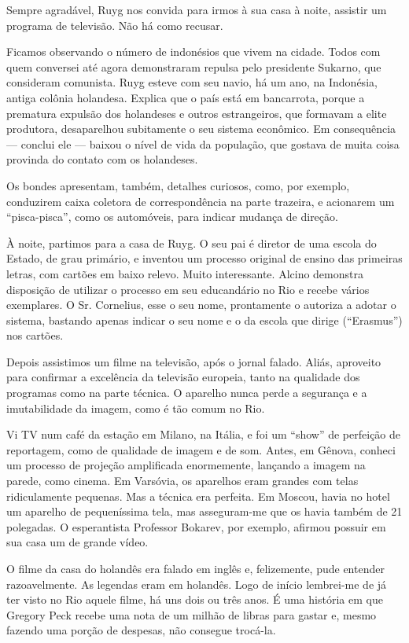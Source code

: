 Sempre agradável, Ruyg nos convida para irmos à sua casa à noite, assistir um programa de televisão. Não há como recusar.

Ficamos observando o número de indonésios que vivem na cidade. Todos com quem conversei até agora demonstraram repulsa pelo presidente Sukarno, que consideram comunista. Ruyg esteve com seu navio, há um ano, na Indonésia, antiga colônia holandesa. Explica que o país está em bancarrota, porque a prematura expulsão dos holandeses e outros estrangeiros, que formavam a elite produtora, desaparelhou subitamente o seu sistema econômico. Em consequência --- conclui ele --- baixou o nível de vida da população, que gostava de muita coisa provinda do contato com os holandeses.

Os bondes apresentam, também, detalhes curiosos, como, por exemplo, conduzirem caixa coletora de correspondência na parte trazeira, e acionarem um ``pisca-pisca'', como os automóveis, para indicar mudança de direção.

À noite, partimos para a casa de Ruyg. O seu pai é diretor de uma escola do Estado, de grau primário, e inventou um processo original de ensino das primeiras letras, com cartões em baixo relevo. Muito interessante. Alcino demonstra disposição de utilizar o processo em seu educandário no Rio e recebe vários exemplares. O Sr. Cornelius, esse o seu nome, prontamente o autoriza a adotar o sistema, bastando apenas indicar o seu nome e o da escola que dirige (``Erasmus'') nos cartões.

Depois assistimos um filme na televisão, após o jornal falado. Aliás, aproveito para confirmar a excelência da televisão europeia, tanto na qualidade dos programas como na parte técnica. O aparelho nunca perde a segurança e a imutabilidade da imagem, como é tão comum no Rio.

Vi TV num café da estação em Milano, na Itália, e foi um ``show'' de perfeição de reportagem, como de qualidade de imagem e de som. Antes, em Gênova, conheci um processo de projeção amplificada enormemente, lançando a imagem na parede, como cinema. Em Varsóvia, os aparelhos eram grandes com telas ridiculamente pequenas. Mas a técnica era perfeita. Em Moscou, havia no hotel um aparelho de pequeníssima tela, mas asseguram-me que os havia também de 21 polegadas. O esperantista Professor Bokarev, por exemplo, afirmou possuir em sua casa um de grande vídeo.

O filme da casa do holandês era falado em inglês e, felizemente, pude entender razoavelmente. As legendas eram em holandês. Logo de início lembrei-me de já ter visto no Rio aquele filme, há uns dois ou três anos. É uma história em que Gregory Peck recebe uma nota de um milhão de libras para gastar e, mesmo fazendo uma porção de despesas, não consegue trocá-la.

